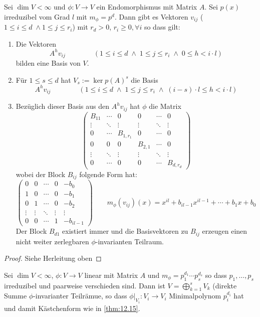 \documentclass{mycourse}
\begin{document}
\begin{thm}
	\label{thm:12.15}
	Sei $\dim V<\infty$ und $\phi: V\to V$ ein Endomorphismus mit Matrix $A$.
	Sei $p(x)$ irreduzibel vom Grad $l$ mit $m_\phi = p^d$.
	Dann gibt es Vektoren $v_{ij}$ ($1\le i \le d \;\land 1\le j \le r_i$) mit $r_d >0$, $r_i\ge 0, \forall i$ so dass gilt:
	\begin{enumerate}[(1)]
		\item
			Die Vektoren
			\[
				A^h v_{ij} \qquad\qquad  (1\le i \le d \;\land\; 1\le j \le r_i \;\land\;  0\le h<i\cdot l)
			\]
			bilden eine Basis von $V$.
		\item
			Für $1\le s\le d$ hat $V_s := \ker p(A)^s$ die Basis 
			\[
				A^hv_{ij} \qquad\qquad (1\le i\le d \;\land\; 1\le j \le r_i \;\land\; (i-s)\cdot l \le h < i\cdot l)
			\]
		\item
			Bezüglich dieser Basis aus den $A^hv_{ij}$ hat $\phi$ die Matrix
			\[
				\begin{pmatrix}
					B_{11} & \cdots &0 & 0 & \cdots & 0\\
					\vdots & \ddots &\vdots &  \vdots & \ddots & \vdots\\
					0 & \cdots & B_{1,r_1} & 0 & \cdots & 0\\
					0 & 0 & 0 & B_{2,1} &\cdots & 0\\
					\vdots & \ddots & \vdots & \vdots & \ddots & \vdots \\
					0 & \cdots & 0 & 0 & \cdots & B_{d,r_d}
				\end{pmatrix}
			\]
			wobei der Block $B_{ij}$ folgende Form hat:
			\[
				\begin{pmatrix}
					0 & 0 & \cdots & 0 & -b_0 \\
					1& 0 &\cdots & 0 & -b_1 \\
					0& 1 & \cdots & 0 & -b_2 \\
					\vdots & \vdots & \ddots & \vdots & \vdots \\
					0 & 0& \cdots & 1 &  -b_{il-1}
				\end{pmatrix}
				\qquad
				m_\phi(v_{ij})(x) = x^{il} + b_{il-1}x^{il-1} + \dotsb + b_1x + b_0
			\]
			Der Block $B_{d1}$ existiert immer und die Basisvektoren zu $B_{ij}$ erzeugen einen nicht weiter zerlegbaren $\phi$-invarianten Teilraum.
	\end{enumerate}
	\begin{proof}
		Siehe Herleitung oben
	\end{proof}
\end{thm}

\begin{thm}
	\label{thm:12.16}
	Sei $\dim V<\infty$, $\phi:V\to V$ linear mit Matrix $A$ und $m_\phi = p_1^{d_1}\dotsb p_s^{d_s}$ so dass $p_1,\dotsc, p_s$ irreduzibel und paarweise verschieden sind.
	Dann ist $V = \bigoplus_{k=1}^s V_k$ (direkte Summe $\phi$-invarianter Teilrämue, so dass $\phi\big|_{V_i} : V_i \to V_i$ Minimalpolynom $p_i^{d_i}$ hat und damit Kästchenform wie in \ref{thm:12.15}.
\end{thm}
\end{document}
